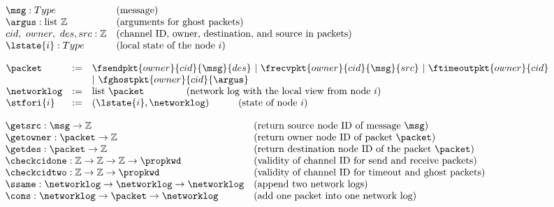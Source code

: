 \begin{figure}
\raggedright
{}

$
\begin{array}{llll}
\msg: Type & \mbox{(message)} \\
\argus: \mathrm{list}\ \mathbb{Z} & \mbox{(arguments for ghost packets)} \\
cid,\ owner,\ des, src: \mathbb{Z} & \mbox{(channel ID, owner, destination, and source in packets)}\\ 
\lstate{i}: Type & \mbox{(local state of the node}\ i\mbox{)} \\
\end{array}$
\vspace{0.5em}

\raggedright
{}

$
\begin{array}{lll}
\packet & :=& \fsendpkt{owner}{cid}{\msg}{des}~\vert~\frecvpkt{owner}{cid}{\msg}{src}~\vert~\ftimeoutpkt{owner}{cid}\\
&&\vert~\fghostpkt{owner}{cid}{\argus}\\
\networklog & := & \mbox{list}\ \packet  \ \ \ \ \ \ \ \ \ \ \ \ \ \mbox{(network log with the local view from node} \  i \mbox{)}\\
\stfori{i} & := & (\lstate{i}, \networklog)  \ \ \ \ \ \ \ \ \ \mbox{(state of  node} \ i\mbox{)}\\
\end{array}
$
\vspace{0.5em}

\raggedright
{}

$
\begin{array}{ll}
\getsrc : \msg \rightarrow \mathbb{Z} & \mbox{(return source node ID of message}\ \msg\mbox{)}\\
\getowner :  \packet \rightarrow \mathbb{Z} & \mbox{(return  owner node ID of  packet}\ \packet\mbox{)}\\
\getdes :  \packet \rightarrow \mathbb{Z} & \mbox{(return destination node ID of the packet}\ \packet\mbox{)}\\
\checkcidone : \mathbb{Z}  \rightarrow \mathbb{Z}  \rightarrow \mathbb{Z}  \rightarrow \propkwd & 
\mbox{(validity of channel ID for send and receive packets)}\\
\checkcidtwo : \mathbb{Z} \rightarrow \mathbb{Z}  \rightarrow \propkwd & 
\mbox{(validity of channel ID for timeout and ghost packets)}\\
\ssame:   \networklog \rightarrow \networklog \rightarrow \networklog & \mbox{(append two network logs)} \\
\cons : \networklog \rightarrow \packet \rightarrow \networklog & \mbox{(add one packet into one network log)} \\
\end{array}
$
\vspace{0.5em}


\end{figure}
